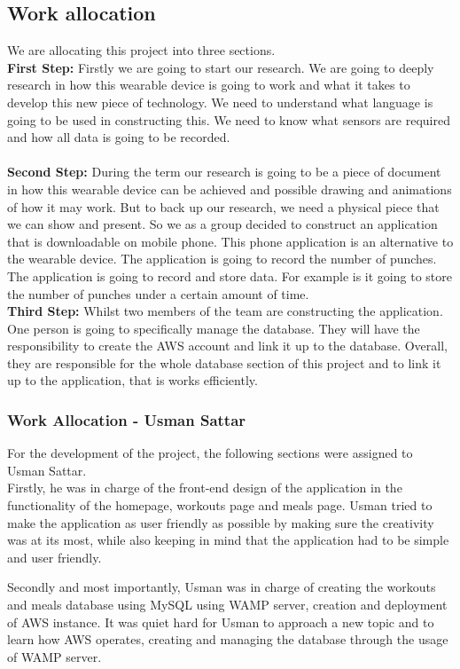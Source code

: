 \documentclass[a4paper,12pt]{report}
\begin{document}
\subsection{Work allocation}
We are allocating this project into three sections.\\
\textbf{First Step:}
Firstly we are going to start our research. We are going to deeply research in how this wearable device is going to work and what it takes to develop this new piece of technology. We need to understand what language is going to be used in constructing this. We need to know what sensors are required and how all data is going to be recorded.\\
\\
\textbf{Second Step:}
During the term our research is going to be a piece of document in how this wearable device can be achieved and possible drawing and animations of how it may work. But to back up our research, we need a physical piece that we can show and present. So we as a group decided to construct an application that is downloadable on mobile phone. This phone application is an alternative to the wearable device. The application is going to record the number of punches. The application is going to record and store data. For example is it going to store the number of punches under a certain amount of time.\\
\newpage
\textbf{Third Step:}
Whilst two members of the team are constructing the application. One person is going to specifically manage the database. They will have the responsibility to create the AWS account and link it up to the database. Overall, they are responsible for the whole database section of this project and to link it up to the application, that is works efficiently.

\subsubsection{Work Allocation - Usman Sattar}
For the development of the project, the following sections were assigned to Usman Sattar.\\
Firstly, he was in charge of the front-end design of the application in the functionality of the homepage, workouts page and meals page. Usman tried to make the application as user friendly as possible by making sure the creativity was at its most, while also keeping in mind that the application had to be simple and user friendly.

Secondly and most importantly, Usman was in charge of creating the workouts and meals database using MySQL using WAMP server, creation and deployment of AWS instance. It was quiet hard for Usman to approach a new topic and to learn how AWS operates, creating and managing the database through the usage of WAMP server.
\end{document}
